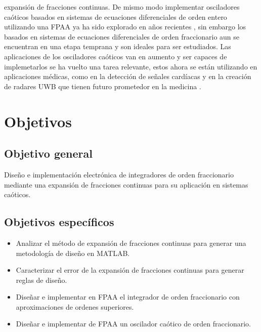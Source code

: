 expansión de fracciones continuas. De mismo modo implementar osciladores caóticos basados en sistemas de ecuaciones diferenciales de orden entero utilizando una FPAA ya ha sido explorado en años recientes \cite{Li2018}, sin embargo los basados en sistemas de ecuaciones diferenciales de orden fraccionario aun se encuentran en una etapa temprana y son ideales para ser estudiados. Las aplicaciones de los osciladores caóticos van en aumento y ser capaces de implemetarlos se ha vuelto una tarea relevante, estos ahora se están utilizando en aplicaciones médicas, como en la detección de señales cardíacas \cite{Jiang2010} y en la creación de radares UWB que tienen futuro prometedor en la medicina \cite{Kumari2017}.
	
	\section{Objetivos}
	
		\subsection{Objetivo general}
			Diseño e implementación electrónica de integradores de orden fraccionario mediante una expansión de fracciones continuas para su aplicación en sistemas caóticos.		
		
		\subsection{Objetivos específicos}
			\begin{itemize}
			\item Analizar el método de expansión de fracciones continuas para generar una metodología de diseño en MATLAB.
			\item Caracterizar el error de la expansión de fracciones continuas para generar reglas de diseño.
			\item Diseñar e implementar en FPAA el integrador de orden fraccionario con aproximaciones de ordenes superiores.
			\item Diseñar e implementar de FPAA un oscilador caótico de orden fraccionario. 
		\end{itemize}
		

